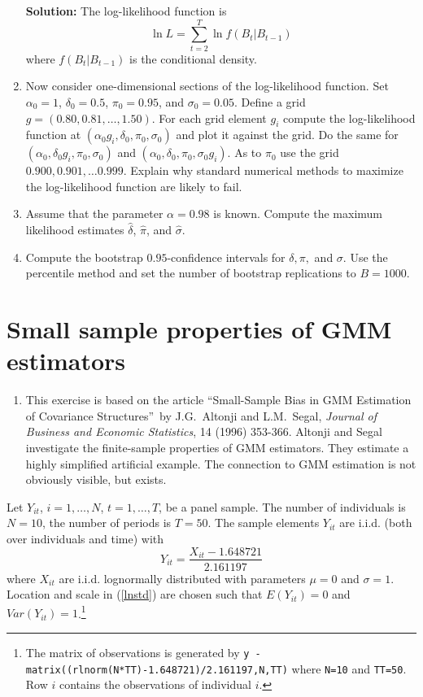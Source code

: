\documentclass{article}
\begin{document}
\begin{enumerate}
\textbf{Solution:} The log-likelihood function is%
\begin{equation*}
\ln L=\sum_{t=2}^{T}\ln f\left( B_{t}|B_{t-1}\right) 
\end{equation*}%
where $f(B_{t}|B_{t-1})$ is the conditional density. 

\item Now consider one-dimensional sections of the log-likelihood function.
Set $\alpha _{0}=1$, $\delta _{0}=0.5$, $\pi _{0}=0.95$, and $\sigma
_{0}=0.05$. Define a grid $g=(0.80,0.81,\ldots ,1.50)$. For each grid
element $g_{i}$ compute the log-likelihood function at $(\alpha
_{0}g_{i},\delta _{0},\pi _{0},\sigma _{0})$ and plot it against the grid.
Do the same for $(\alpha _{0},\delta _{0}g_{i},\pi _{0},\sigma _{0})$ and $%
(\alpha _{0},\delta _{0},\pi _{0},\sigma _{0}g_{i})$. As to $\pi _{0}$ use
the grid $0.900,0.901,\ldots 0.999$. Explain why standard numerical methods
to maximize the log-likelihood function are likely to fail.

\item Assume that the parameter $\alpha =0.98$ is known. Compute the maximum
likelihood estimates $\hat{\delta}$, $\hat{\pi}$, and $\hat{\sigma}$.

\item Compute the bootstrap $0.95$-confidence intervals for $\delta ,\pi ,$
and $\sigma $. Use the percentile method and set the number of bootstrap
replications to $B=1000$.\newpage 
\end{enumerate}

\section{Small sample properties of GMM estimators}

\begin{enumerate}
\item This exercise is based on the article \textquotedblleft Small-Sample
Bias in GMM Estimation of Covariance Structures\textquotedblright\ by J.G.\
Altonji and L.M.\ Segal, \emph{Journal of Business and Economic Statistics},
14 (1996) 353-366. Altonji and Segal investigate the finite-sample
properties of GMM estimators. They estimate a highly simplified artificial
example. The connection to GMM estimation is not obviously visible, but
exists.
\end{enumerate}

Let $Y_{it}$, $i=1,\ldots ,N$, $t=1,\ldots ,T$, be a panel sample. The
number of individuals is $N=10$, the number of periods is $T=50$. The sample
elements $Y_{it}$ are i.i.d. (both over individuals and time) with 
\begin{equation}
Y_{it}=\frac{X_{it}-1.648721}{2.161197}  \label{lnstd}
\end{equation}%
where $X_{it}$ are i.i.d. lognormally distributed with parameters $\mu =0$
and $\sigma =1$. Location and scale in (\ref{lnstd}) are chosen such that $%
E(Y_{it})=0$ and $Var(Y_{it})=1$.\footnote{%
The matrix of observations is generated by \texttt{y \TEXTsymbol{<}-
matrix((rlnorm(N*TT)-1.648721)/2.161197,N,TT)} where \texttt{N=10} and 
\texttt{TT=50}. Row $i$ contains the observations of individual $i$.}
\end{document}
